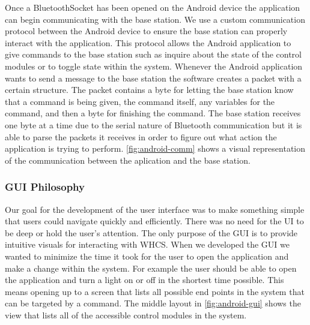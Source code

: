 Once a BluetoothSocket has been opened on the Android device the application
can begin communicating with the base station. We use a custom communication
protocol between the Android device to ensure the base station can properly
interact with the application. This protocol allows the Android application
to give commands to the base station such as inquire about the state of the
control modules or to toggle state within the system. Whenever the Android
application wants to send a message to the base station the software 
creates a packet with a certain structure. The packet contains a byte for
letting the base station know that a command is being given, the command
itself, any variables for the command, and then a byte for finishing the
command. The base station receives one byte at a time due to the serial
nature of Bluetooth communication but it is able to parse the packets it
receives in order to figure out what action the application is trying to
perform. \autoref{fig:android-comm} shows a visual representation of the
communication between the aplication and the base station.


\subsubsection{GUI Philosophy} Our goal for the development of the user
interface was to make something simple that users could navigate quickly and
efficiently. There was no need for the UI to be deep or hold the user{}'s
attention. The only purpose of the GUI is to provide intuitive visuals for
interacting with WHCS. When we developed the GUI we wanted to minimize the time
it took for the user to open the application and make a change within the
system. For example the user should be able to open the application and turn a
light on or off in the shortest time possible. This means opening up to a
screen that lists all possible end points in the system that can be targeted by
a command. The middle layout in \autoref{fig:android-gui} shows the view
that lists all of the accessible control modules in the system.


